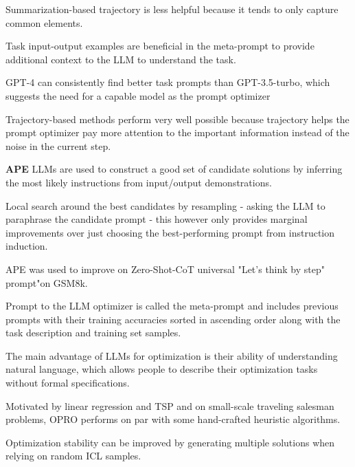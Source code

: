 Summarization-based trajectory is less helpful because it tends to only capture common elements. \cite{tang2024unleashingpotentiallargelanguage}

Task input-output examples are beneficial in the meta-prompt to provide additional context to the LLM to understand the task. \cite{tang2024unleashingpotentiallargelanguage}

GPT-4 can consistently find better task prompts than GPT-3.5-turbo, which suggests the need for a capable model as the prompt optimizer \cite{tang2024unleashingpotentiallargelanguage}

Trajectory-based methods perform very well possible because trajectory helps the prompt optimizer pay more attention to the important information instead of the noise in the current step. \cite{tang2024unleashingpotentiallargelanguage}

\textbf{APE}
LLMs are used to construct a good set of candidate solutions by inferring the most likely instructions from input/output demonstrations. \cite{zhou2023largelanguagemodelshumanlevel}

Local search around the best candidates by resampling - asking the LLM to paraphrase the candidate prompt - this however only provides marginal improvements over just choosing the best-performing prompt from instruction induction. \cite{zhou2023largelanguagemodelshumanlevel}

APE was used to improve on Zero-Shot-CoT \cite{NEURIPS2022_8bb0d291} universal "Let's think by step" prompt"on GSM8k.\cite{zhou2023largelanguagemodelshumanlevel}


Prompt to the LLM optimizer is called the meta-prompt and includes previous prompts with their training accuracies sorted in ascending order along with the task description and training set samples. \cite{yang2024largelanguagemodelsoptimizers}

The main advantage of LLMs for optimization is their ability of understanding natural language, which allows people to describe their optimization tasks without formal specifications. \cite{yang2024largelanguagemodelsoptimizers}

Motivated by linear regression and TSP and on small-scale traveling salesman problems, OPRO performs on par with some hand-crafted heuristic algorithms. \cite{yang2024largelanguagemodelsoptimizers}

Optimization stability can be improved by generating multiple solutions when relying on random ICL samples. \cite{yang2024largelanguagemodelsoptimizers}

